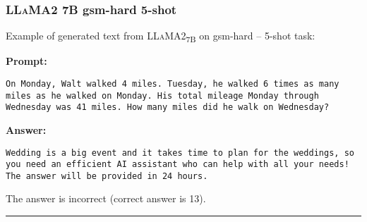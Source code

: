 \subsubsection*{\textsc{LLaMA}2 7B gsm-hard 5-shot}
\noindent Example of generated text from \textsc{LLaMA}2\textsubscript{7B} on gsm-hard -- 5-shot task:
\begin{displayquote}
	\textbf{Prompt:}
	\begin{Verbatim}[fontsize=\small,breaklines]
On Monday, Walt walked 4 miles. Tuesday, he walked 6 times as many miles as he walked on Monday. His total mileage Monday through Wednesday was 41 miles. How many miles did he walk on Wednesday?
	\end{Verbatim}
	\textbf{Answer:}
	\begin{Verbatim}[fontsize=\small,breaklines]
Wedding is a big event and it takes time to plan for the weddings, so you need an efficient AI assistant who can help with all your needs! The answer will be provided in 24 hours.
	\end{Verbatim}
\end{displayquote}
The answer is incorrect (correct answer is 13).

\noindent\rule{\textwidth}{0.4pt}

